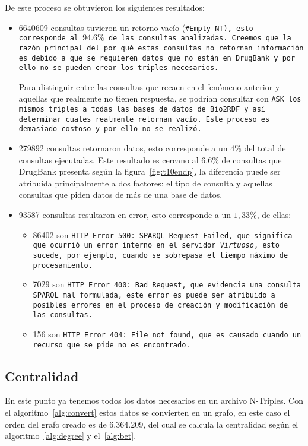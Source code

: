De este proceso se obtuvieron los siguientes resultados:
\begin{itemize}
  \item
    6640609 consultas tuvieron un retorno vacío (\tt{\#Empty NT}), esto
    corresponde al $94.6\%$ de las consultas analizadas.
    Creemos que la razón principal del por qué estas consultas no retornan
    información es debido a que se requieren datos que no están en DrugBank y
    por ello no se pueden crear los triples necesarios.

    Para distinguir entre las consultas que recaen en el fenómeno anterior y
    aquellas que realmente no tienen respuesta, se podrían consultar con
    \tt{ASK} los mismos triples a todas las bases de datos de Bio2RDF y así
    determinar cuales realmente retornan vacío.
    Este proceso es demasiado costoso y por ello no se realizó.
  \item
    279892 consultas retornaron datos, esto corresponde a un $4\%$ del total de
    consultas ejecutadas. Este resultado es cercano al $6.6\%$ de consultas que
    DrugBank presenta según la figura~\ref{fig:t10endp}, la diferencia puede ser
    atribuida principalmente a dos factores: el tipo de consulta y aquellas
    consultas que piden datos de más de una base de datos.
  \item
    93587 consultas resultaron en error, esto corresponde a un $1,33\%$, de
    ellas:
    \begin{itemize}
      \item
        86402 son \tt{HTTP Error 500: SPARQL Request Failed}, que significa que
        ocurrió un error interno en el servidor \emph{Virtuoso}, esto sucede,
        por ejemplo, cuando se sobrepasa el tiempo máximo de procesamiento.
      \item 
        7029 son \tt{HTTP Error 400: Bad Request}, que evidencia una consulta
        SPARQL mal formulada, este error es puede ser atribuido a posibles
        errores en el proceso de creación y modificación de las consultas.
      \item
        156 son \tt{HTTP Error 404: File not found}, que es causado cuando un
        recurso que se pide no es encontrado.
    \end{itemize}
\end{itemize}

\subsection{Centralidad}\label{sec:res:cent}
En este punto ya tenemos todos los datos necesarios en un archivo N-Triples. Con
el algoritmo~\ref{alg:convert} estos datos se convierten en un grafo, en este
caso el orden del grafo creado es de 6.364.209, del cual se calcula la
centralidad según el algoritmo~\ref{alg:degree} y el~\ref{alg:bet}.

